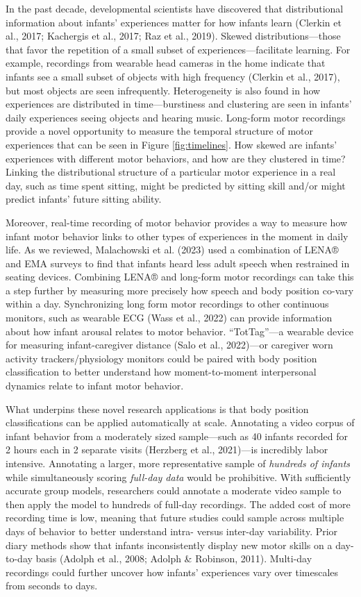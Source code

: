 \documentclass[
  man]{apa6}
\begin{document}
In the past decade, developmental scientists have discovered that distributional information about infants' experiences matter for how infants learn (Clerkin et al., 2017; Kachergis et al., 2017; Raz et al., 2019). Skewed distributions---those that favor the repetition of a small subset of experiences---facilitate learning. For example, recordings from wearable head cameras in the home indicate that infants see a small subset of objects with high frequency (Clerkin et al., 2017), but most objects are seen infrequently. Heterogeneity is also found in how experiences are distributed in time---burstiness and clustering are seen in infants' daily experiences seeing objects and hearing music. Long-form motor recordings provide a novel opportunity to measure the temporal structure of motor experiences that can be seen in Figure \ref{fig:timelines}. How skewed are infants' experiences with different motor behaviors, and how are they clustered in time? Linking the distributional structure of a particular motor experience in a real day, such as time spent sitting, might be predicted by sitting skill and/or might predict infants' future sitting ability.

Moreover, real-time recording of motor behavior provides a way to measure how infant motor behavior links to other types of experiences in the moment in daily life. As we reviewed, Malachowski et al. (2023) used a combination of LENA® and EMA surveys to find that infants heard less adult speech when restrained in seating devices. Combining LENA® and long-form motor recordings can take this a step further by measuring more precisely how speech and body position co-vary within a day. Synchronizing long form motor recordings to other continuous monitors, such as wearable ECG (Wass et al., 2022) can provide information about how infant arousal relates to motor behavior. ``TotTag''---a wearable device for measuring infant-caregiver distance (Salo et al., 2022)---or caregiver worn activity trackers/physiology monitors could be paired with body position classification to better understand how moment-to-moment interpersonal dynamics relate to infant motor behavior.

What underpins these novel research applications is that body position classifications can be applied automatically at scale. Annotating a video corpus of infant behavior from a moderately sized sample---such as 40 infants recorded for 2 hours each in 2 separate visits (Herzberg et al., 2021)---is incredibly labor intensive. Annotating a larger, more representative sample of \emph{hundreds of infants} while simultaneously scoring \emph{full-day data} would be prohibitive. With sufficiently accurate group models, researchers could annotate a moderate video sample to then apply the model to hundreds of full-day recordings. The added cost of more recording time is low, meaning that future studies could sample across multiple days of behavior to better understand intra- versus inter-day variability. Prior diary methods show that infants inconsistently display new motor skills on a day-to-day basis (Adolph et al., 2008; Adolph \& Robinson, 2011). Multi-day recordings could further uncover how infants' experiences vary over timescales from seconds to days.
\end{document}
